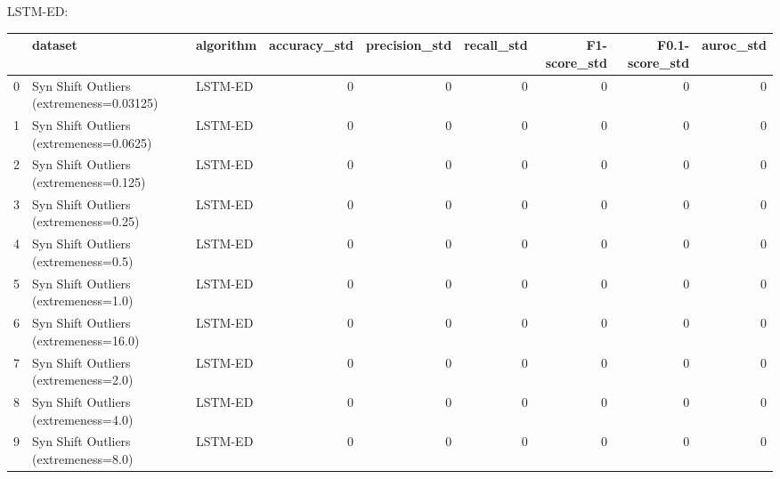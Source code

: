 LSTM-ED:

\begin{tabular}{rllrrrrrr}
\hline
    & dataset                                  & algorithm   &   accuracy\_std &   precision\_std &   recall\_std &   F1-score\_std &   F0.1-score\_std &   auroc\_std \\
\hline
  0 & Syn Shift Outliers (extremeness=0.03125) & LSTM-ED     &              0 &               0 &            0 &              0 &                0 &           0 \\
  1 & Syn Shift Outliers (extremeness=0.0625)  & LSTM-ED     &              0 &               0 &            0 &              0 &                0 &           0 \\
  2 & Syn Shift Outliers (extremeness=0.125)   & LSTM-ED     &              0 &               0 &            0 &              0 &                0 &           0 \\
  3 & Syn Shift Outliers (extremeness=0.25)    & LSTM-ED     &              0 &               0 &            0 &              0 &                0 &           0 \\
  4 & Syn Shift Outliers (extremeness=0.5)     & LSTM-ED     &              0 &               0 &            0 &              0 &                0 &           0 \\
  5 & Syn Shift Outliers (extremeness=1.0)     & LSTM-ED     &              0 &               0 &            0 &              0 &                0 &           0 \\
  6 & Syn Shift Outliers (extremeness=16.0)    & LSTM-ED     &              0 &               0 &            0 &              0 &                0 &           0 \\
  7 & Syn Shift Outliers (extremeness=2.0)     & LSTM-ED     &              0 &               0 &            0 &              0 &                0 &           0 \\
  8 & Syn Shift Outliers (extremeness=4.0)     & LSTM-ED     &              0 &               0 &            0 &              0 &                0 &           0 \\
  9 & Syn Shift Outliers (extremeness=8.0)     & LSTM-ED     &              0 &               0 &            0 &              0 &                0 &           0 \\
\hline
\end{tabular}

